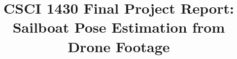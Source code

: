 %
%
%

%
%
%
%
% 
%
%
% 

\documentclass[10pt,twocolumn,letterpaper]{article}
 
\usepackage{cvpr}
\usepackage{times}
\usepackage{epsfig}
\usepackage{graphicx}
\usepackage{amsmath}
\usepackage{amssymb}
\usepackage{booktabs}
\usepackage{microtype}
\usepackage[numbered,framed]{matlab-prettifier}

\frenchspacing


\usepackage[pagebackref=true,breaklinks=true,letterpaper=true,colorlinks,bookmarks=false]{hyperref}

\cvprfinalcopy
\def\cvprPaperID{****}
\def\httilde{\mbox{\tt\raisebox{-.5ex}{\symbol{126}}}}
\ifcvprfinal\pagestyle{empty}\fi



\title{CSCI 1430 Final Project Report:\\Sailboat Pose Estimation from Drone Footage}


